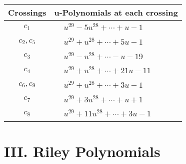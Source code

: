 \documentclass[1p]{elsarticle_modified}
\theoremstyle{definition}
\begin{document}
\begin{tabular}{m{50pt}|m{274pt}}
Crossings & \hspace{64pt}u-Polynomials at each crossing \\
\hline $$\begin{aligned}c_{1}\end{aligned}$$&$\begin{aligned}
&u^{29}-5 u^{28}+\cdots+u-1
\end{aligned}$\\
\hline $$\begin{aligned}c_{2},c_{5}\end{aligned}$$&$\begin{aligned}
&u^{29}+u^{28}+\cdots+5 u-1
\end{aligned}$\\
\hline $$\begin{aligned}c_{3}\end{aligned}$$&$\begin{aligned}
&u^{29}- u^{28}+\cdots- u-19
\end{aligned}$\\
\hline $$\begin{aligned}c_{4}\end{aligned}$$&$\begin{aligned}
&u^{29}+u^{28}+\cdots+21 u-11
\end{aligned}$\\
\hline $$\begin{aligned}c_{6},c_{9}\end{aligned}$$&$\begin{aligned}
&u^{29}+u^{28}+\cdots+3 u-1
\end{aligned}$\\
\hline $$\begin{aligned}c_{7}\end{aligned}$$&$\begin{aligned}
&u^{29}+3 u^{28}+\cdots+u+1
\end{aligned}$\\
\hline $$\begin{aligned}c_{8}\end{aligned}$$&$\begin{aligned}
&u^{29}+11 u^{28}+\cdots+3 u-1
\end{aligned}$\\
\hline
\end{tabular}\newpage\renewcommand{\arraystretch}{1}
\centering \section*{ III. Riley Polynomials}
\end{document}
